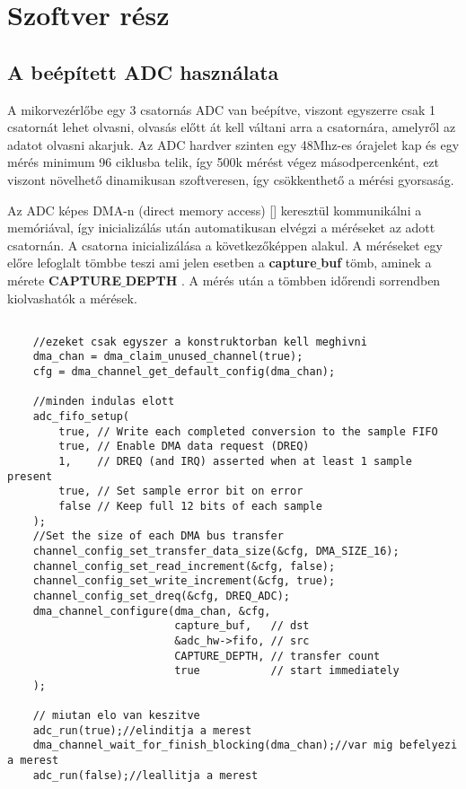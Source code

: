 \section{Szoftver rész}

\subsection{A beépített ADC használata}

A mikorvezérlőbe egy 3 csatornás ADC van beépítve, viszont egyszerre csak 1 
csatornát lehet olvasni, olvasás előtt át kell váltani arra a csatornára, amelyről
az adatot olvasni akarjuk. Az ADC hardver szinten egy 48Mhz-es órajelet kap és
egy mérés minimum 96 ciklusba telik, így 500k mérést végez másodpercenként, 
ezt viszont növelhető dinamikusan szoftveresen, így csökkenthető a mérési gyorsaság.


Az ADC képes DMA-n (direct memory access) [\cite{DMA}] keresztül kommunikálni a 
memóriával, így inicializálás után automatikusan elvégzi a méréseket az adott
csatornán. A csatorna inicializálása a következőképpen alakul. A méréseket
egy előre lefoglalt tömbbe teszi ami jelen esetben a \textbf{capture$\_$buf} tömb,
aminek a mérete \textbf{CAPTURE$\_$DEPTH} . A mérés után a tömbben időrendi sorrendben
kiolvashatók a mérések.


\begin{lstlisting}

    //ezeket csak egyszer a konstruktorban kell meghivni
    dma_chan = dma_claim_unused_channel(true);
    cfg = dma_channel_get_default_config(dma_chan);

    //minden indulas elott
    adc_fifo_setup(
        true, // Write each completed conversion to the sample FIFO
        true, // Enable DMA data request (DREQ)
        1,    // DREQ (and IRQ) asserted when at least 1 sample present
        true, // Set sample error bit on error
        false // Keep full 12 bits of each sample
    );
    //Set the size of each DMA bus transfer
    channel_config_set_transfer_data_size(&cfg, DMA_SIZE_16);
    channel_config_set_read_increment(&cfg, false);
    channel_config_set_write_increment(&cfg, true);
    channel_config_set_dreq(&cfg, DREQ_ADC);
    dma_channel_configure(dma_chan, &cfg,
                          capture_buf,   // dst
                          &adc_hw->fifo, // src
                          CAPTURE_DEPTH, // transfer count
                          true           // start immediately
    );

    // miutan elo van keszitve
    adc_run(true);//elinditja a merest
    dma_channel_wait_for_finish_blocking(dma_chan);//var mig befelyezi a merest
    adc_run(false);//leallitja a merest

\end{lstlisting}


